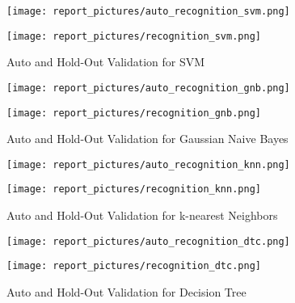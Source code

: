 \documentclass[a4,12pt]{article}
\begin{document}
	\begin{figure}[H]
		\centering
			\begin{minipage}[c]{.46\linewidth}
      			\texttt{[image: report\_pictures/auto\_recognition\_svm.png]}
  			\end{minipage} \hfill
   			\begin{minipage}[c]{.46\linewidth}
      			\texttt{[image: report\_pictures/recognition\_svm.png]}
   			\end{minipage}
		\caption{Auto and Hold-Out Validation for SVM}
		\label{svm}
	\end{figure}
	
	\begin{figure}[H]
		\centering
			\begin{minipage}[c]{.46\linewidth}
      			\texttt{[image: report\_pictures/auto\_recognition\_gnb.png]}
  			\end{minipage} \hfill
   			\begin{minipage}[c]{.46\linewidth}
      			\texttt{[image: report\_pictures/recognition\_gnb.png]}
   			\end{minipage}
		\caption{Auto and Hold-Out Validation for Gaussian Naive Bayes}
		\label{gnb}
	\end{figure}
	
	\begin{figure}[H]
		\centering
			\begin{minipage}[c]{.46\linewidth}
      			\texttt{[image: report\_pictures/auto\_recognition\_knn.png]}
  			\end{minipage} \hfill
   			\begin{minipage}[c]{.46\linewidth}
      			\texttt{[image: report\_pictures/recognition\_knn.png]}
   			\end{minipage}
		\caption{Auto and Hold-Out Validation for k-nearest Neighbors}
		\label{knn}
	\end{figure}
	
	\begin{figure}[H]
		\centering
			\begin{minipage}[c]{.46\linewidth}
      			\texttt{[image: report\_pictures/auto\_recognition\_dtc.png]}
  			\end{minipage} \hfill
   			\begin{minipage}[c]{.46\linewidth}
      			\texttt{[image: report\_pictures/recognition\_dtc.png]}
   			\end{minipage}
		\caption{Auto and Hold-Out Validation for Decision Tree}
		\label{dtc}
	\end{figure}
	
\end{document}
